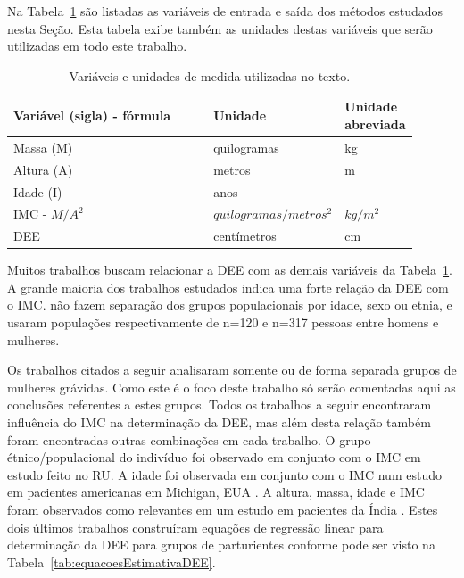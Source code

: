 Na Tabela~\ref{tab:variaveisUnidades} são listadas as variáveis de entrada e saída dos métodos estudados nesta Seção. Esta tabela exibe também as unidades destas variáveis que serão utilizadas em todo este trabalho.

\begin{table}[!ht]
\begin{center}
\caption{Variáveis e unidades de medida utilizadas no texto.}
\label{tab:variaveisUnidades}
\begin{tabular}{|p{0.52\linewidth}|p{0.25\linewidth}|p{0.13\linewidth}|}
\hline
\textbf{Variável (sigla) - fórmula} & \textbf{Unidade} & \textbf{Unidade abreviada}\\
\hline\hline
Massa (M) & quilogramas & kg \\
Altura (A) & metros & m \\
Idade (I) & anos & - \\
\acrfull{IMC} - $M/A^2$ & $quilogramas/metros^2$ & $kg/m^2$ \\
\acrfull{DEE} & centímetros & cm \\
\hline
\end{tabular}
\end{center}
\end{table}

Muitos trabalhos buscam relacionar a \acrfull{DEE} com as demais variáveis da Tabela~\ref{tab:variaveisUnidades}. A grande maioria dos trabalhos estudados indica uma forte relação da \acrshort{DEE} com o \acrshort{IMC}. \textcite{Adegboye2017, Galbraith2018} não fazem separação dos grupos populacionais por idade, sexo ou etnia, e usaram populações respectivamente de n=120 e n=317 pessoas entre homens e mulheres.

Os trabalhos citados a seguir analisaram somente ou de forma separada grupos de mulheres grávidas. Como este é o foco deste trabalho só serão comentadas aqui as conclusões referentes a estes grupos. Todos os trabalhos a seguir encontraram influência do \acrshort{IMC} na determinação da \acrshort{DEE}, mas além desta relação também foram encontradas outras combinações em cada trabalho. O grupo étnico/populacional do indivíduo foi observado em conjunto com o \acrshort{IMC} em \textcite{Sharma2011} estudo feito no \acrfull{RU}. A idade foi observada em conjunto com o \acrshort{IMC} num estudo em pacientes americanas em Michigan, EUA \cite{Clinkscales2007}. A altura, massa, idade e \acrshort{IMC} foram observados como relevantes em um estudo em pacientes da Índia \cite{Hazarika2016}. Estes dois últimos trabalhos construíram equações de regressão linear para determinação da \acrshort{DEE} para grupos de parturientes conforme pode ser visto na Tabela~\ref{tab:equacoesEstimativaDEE}.

